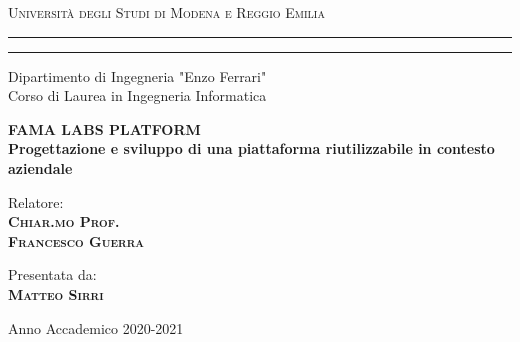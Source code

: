 \textwidth=450pt\oddsidemargin=0pt

\begin{titlepage}
    \begin{center}
        {{\large{\textsc{Universit\`a degli Studi di Modena e Reggio Emilia}}}} \rule[0.1cm]{15.8cm}{0.1mm}
        \rule[0.5cm]{15.8cm}{0.6mm}
        {\small{\textsc Dipartimento di Ingegneria "Enzo Ferrari"\\
                Corso di Laurea in Ingegneria Informatica }}
    \end{center}
    \vspace{15mm}
    \begin{center}
        {\large{\textbf{FAMA LABS PLATFORM} }}\\
        \vspace{2mm}
        {\small{\textbf{Progettazione e sviluppo di una piattaforma riutilizzabile in contesto aziendale}}}\\
        \vspace{3mm}
    \end{center}
    \vspace{40mm}
    \par
    \noindent
    \begin{minipage}[t]{0.47\textwidth}
        {\large{\textsc Relatore:}\\
        {\bf \textsc{Chiar.mo Prof.\\
            Francesco Guerra}}}
    \end{minipage}
    \hfill
    \begin{minipage}[t]{0.47\textwidth}\raggedleft
        {\large{\textsc Presentata da:}\\
        {\bf \textsc{ Matteo Sirri}}}
    \end{minipage}

    \vspace*{\fill}
    \begin{center}
        {\large{\textsc Anno Accademico 2020-2021 }}
    \end{center}
\end{titlepage}
